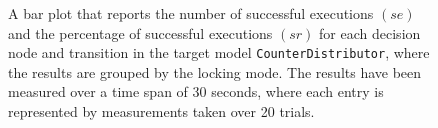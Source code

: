 \begin{figure}[h!]
\centering
\begin{minipage}{1\textwidth}
  \centering
  \makebox[\textwidth][c]{ %
        \resizebox{1.19\textwidth}{!}{ %
            
        }%
    }%
\end{minipage}
\caption{A bar plot that reports the number of successful executions $(se)$ and the percentage of successful executions $(sr)$ for each decision node and transition in the target model \texttt{CounterDistributor}, where the results are grouped by the locking mode. The results have been measured over a time span of 30 seconds, where each entry is represented by measurements taken over 20 trials.}
\label{figure:locking_mode_transition_frequency_comparison_counterdistributor}
\end{figure}